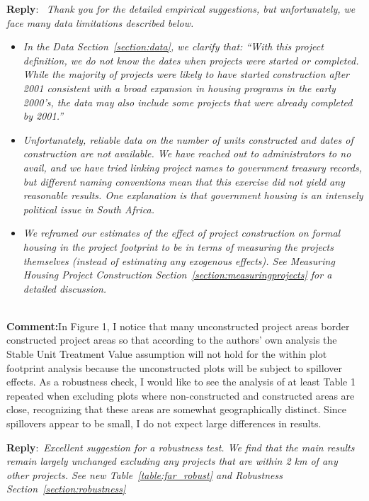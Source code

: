 \documentclass{article}
\newcommand{\reply}{\medskip \noindent \textbf{Reply}:\ \textit }
\newcommand{\sr}{\begin{minipage}{\dimexpr\textwidth-3cm}}
\newcommand{\er}{\end{minipage}}
\newcommand{\cc}{\medskip \noindent \textbf{Comment:}\hspace{2em}}
\begin{document}
\sr
\reply{ Thank you for the detailed empirical suggestions, but unfortunately, we face many data limitations described below.}
\begin{itemize}
\item \textit{ In the Data Section~\ref{section:data}, we clarify that: ``With this project definition, we do not know the dates when projects were started or completed.  While the majority of projects were likely to have started construction after 2001 consistent with a broad expansion in housing programs in the early 2000's, the data may also include some projects that were already completed by 2001.'' }
\item \textit{ Unfortunately, reliable data on the number of units constructed and dates of construction are not available.  We have reached out to administrators to no avail, and we have tried linking project names to government treasury records, but different naming conventions mean that this exercise did not yield any reasonable results.  One explanation is that government housing is an intensely political issue in South Africa.  }
\item \textit{We reframed our estimates of the effect of project construction on formal housing in the project footprint to be in terms of measuring the projects themselves (instead of estimating any exogenous effects).  See Measuring Housing Project Construction Section~\ref{section:measuringprojects} for a detailed discussion.} 
\end{itemize}
  
\er\\

\cc In Figure 1, I notice that many unconstructed project areas border constructed project areas so that according to the authors' own analysis the Stable Unit Treatment Value assumption will not hold for the within plot footprint analysis because the unconstructed plots will be subject to spillover effects. As a robustness check, I would like to see the analysis of at least Table 1 repeated when excluding plots where non-constructed and constructed areas are close, recognizing that these areas are somewhat geographically distinct. Since spillovers appear to be small, I do not expect large differences in results.

\sr
\reply{Excellent suggestion for a robustness test.  We find that the main results remain largely unchanged excluding any projects that are within 2 km of any other projects. See new Table~\ref{table:far_robust} and Robustness Section~\ref{section:robustness} }\\
\er
\end{document}
